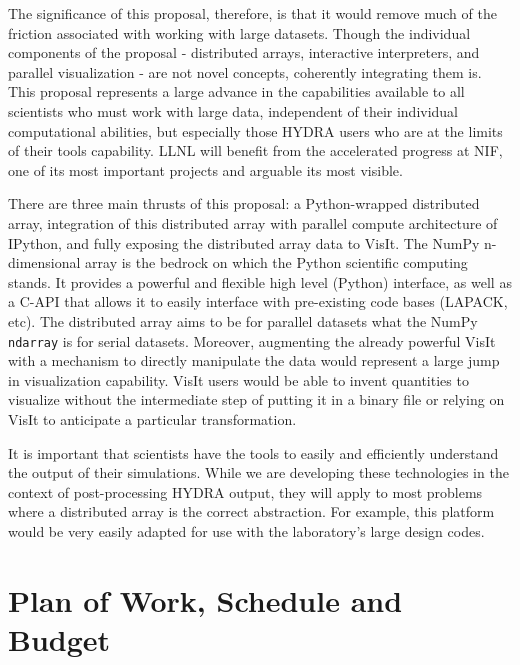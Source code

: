\documentclass[letterpaper,11pt]{article}
\begin{document}
The significance of this proposal, therefore, is that it would remove much of the friction 
associated with working with large datasets.  Though the individual components of the 
proposal - distributed arrays, interactive interpreters, and parallel visualization - are 
not novel concepts, coherently integrating them is.  This proposal represents a large 
advance in the capabilities available to all scientists who must work with large data, 
independent of their individual computational abilities, but especially those HYDRA users
who are at the limits of their tools capability.  LLNL will benefit from the accelerated
progress at NIF, one of its most important projects and arguable its most visible.

There are three main thrusts of this proposal: a Python-wrapped distributed array, integration 
of this distributed array with parallel compute architecture of IPython, and fully exposing 
the distributed array data to VisIt.  The NumPy n-dimensional array is the bedrock on which the Python scientific computing stands.  
It provides a powerful and flexible high level (Python) interface, as well as a C-API that 
allows it to easily interface with pre-existing code bases (LAPACK, etc).  The distributed 
array aims to be for parallel datasets what the NumPy \texttt{ndarray} is for serial datasets.
Moreover, augmenting the already powerful VisIt with a mechanism to directly manipulate the 
data would represent a large jump in visualization capability.  VisIt users would be able 
to invent quantities to visualize without the intermediate step of putting it in a binary 
file or relying on VisIt to anticipate a particular transformation.

It is important that scientists have the tools to easily and efficiently understand the output of their
simulations.  While we are developing these technologies in the context of post-processing HYDRA output, 
they will apply to most problems where a distributed array is the correct abstraction.  
For example, this platform would be very easily adapted for use with the laboratory's large 
design codes.



\section*{Plan of Work, Schedule and Budget}
\end{document}
